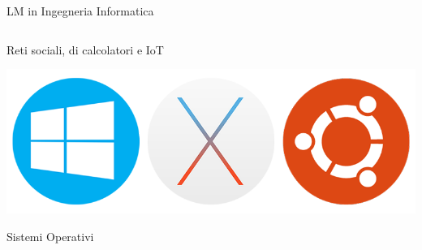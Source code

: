 \documentclass{beamer}
\begin{document}
\begin{frame}{LM in Ingegneria Informatica}
\begin{columns}
\begin{column}{0.4\textwidth}
				Reti sociali, di calcolatori e IoT

				\vspace{1cm}
				\includegraphics[width=\textwidth]{sistemi-operativi.png}

				Sistemi Operativi
			\end{column}
		\end{columns}
	\end{frame}
\end{document}
